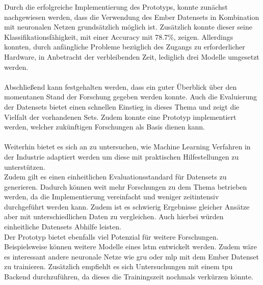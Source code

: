 \documentclass[
    12pt, %
    DIV10,
    ngerman, %
    a4paper, %
    oneside, %
    titlepage, %
    parskip=half, %
    headings=normal, %
    listof=totoc, %
    bibliography=totoc, %
    index=totoc, %
    captions=tableheading, %
    final %
]{scrreprt}
\begin{document}
Durch die erfolgreiche Implementierung des Prototyps, konnte zunächst nachgewiesen werden, dass die Verwendung des Ember Datensets in Kombination mit neuronalen Netzen grundsätzlich möglich ist. Zusätzlich konnte dieser seine Klassifikationsfähigkeit, mit einer Accuracy mit 78.7\%, zeigen. Allerdings konnten, durch anfängliche Probleme bezüglich des Zugangs zu erforderlicher Hardware, in Anbetracht der verbleibenden Zeit, lediglich drei Modelle umgesetzt werden.\\\\
Abschlie{\ss}end kann festgehalten werden, dass ein guter Überblick über den momentanen Stand der Forschung gegeben werden konnte. Auch die Evaluierung der Datensets bietet einen schnellen Einstieg in dieses Thema und zeigt die Vielfalt der vorhandenen Sets. Zudem konnte eine Prototyp implementiert werden, welcher zukünftigen Forschungen als Basis dienen kann.
\\\\
Weiterhin bietet es sich an zu untersuchen, wie Machine Learning Verfahren in der Industrie adaptiert werden um diese mit praktischen Hilfestellungen zu unterstützen.\\ Zudem gilt es einen einheitlichen Evaluationsstandard für Datensets zu generieren. Dadurch können weit mehr Forschungen zu dem Thema betrieben werden, da die Implementierung vereinfacht und weniger zeitintensiv durchgeführt werden kann. Zudem ist es schwierig Ergebnisse gleicher Ansätze aber mit unterschiedlichen Daten zu vergleichen. Auch hierbei würden einheitliche Datensets Abhilfe leisten.\\
Der Prototyp bietet ebenfalls viel Potenzial für weitere Forschungen. Beispielsweise können weitere Modelle eines \ac{lstm} entwickelt werden. Zudem wäre es interessant andere neuronale Netze wie \ac{gru} oder \ac{mlp} mit dem Ember Datenset zu trainieren. Zusätzlich empfiehlt es sich Untersuchungen mit einem \ac{tpu} Backend durchzuführen, da dieses die Trainingszeit nochmals verkürzen könnte.

\newpage
{}
%
%
\printbibheading[heading=bibnumbered]
%
%
\printbibliography[notkeyword=internet, heading=subbibliography, %
   title={Bücher und Journals}]
\printbibliography[keyword=internet, heading=subbibliography, %
   title={Internetquellen}]

\appendix
\newpage
\end{document}
